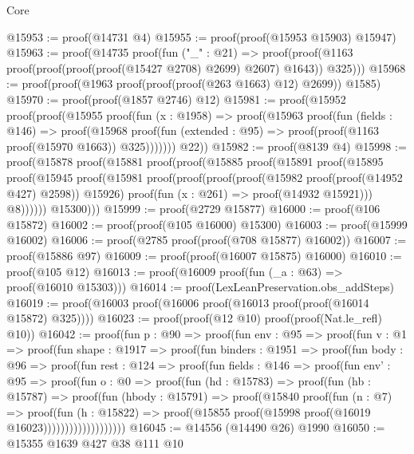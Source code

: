 \begin{lexlean}{Core}
\begin{coremodule}
@15953 := proof(@14731 @4)
@15955 := proof(proof(@15953 @15903) @15947)
@15963 := proof(@14735
      proof(fun ("_" : @21) =>
        proof(proof(@1163 proof(proof(proof(proof(@15427 @2708) @2699) @2607) @1643)) @325)))
@15968 := proof(proof(@1963 proof(proof(proof(@263 @1663) @12) @2699)) @1585)
@15970 := proof(proof(@1857 @2746) @12)
@15981 := proof(@15952
      proof(proof(@15955
            proof(fun (x : @1958) =>
              proof(@15963
                  proof(fun (fields : @146) =>
                    proof(@15968
                        proof(fun (extended : @95) =>
                          proof(proof(@1163 proof(@15970 @1663)) @325)))))))
          @22))
@15982 := proof(@8139 @4)
@15998 := proof(@15878
      proof(@15881
          proof(proof(@15885
                proof(@15891
                    proof(@15895
                        proof(@15945
                            proof(@15981
                                proof(proof(proof(proof(@15982 proof(proof(@14952 @427) @2598))
                                        @15926)
                                      proof(fun (x : @261) => proof(@14932 @15921)))
                                    @8))))))
              @15300)))
@15999 := proof(@2729 @15877)
@16000 := proof(@106 @15872)
@16002 := proof(proof(@105 @16000) @15300)
@16003 := proof(@15999 @16002)
@16006 := proof(@2785 proof(proof(@708 @15877) @16002))
@16007 := proof(@15886 @97)
@16009 := proof(proof(@16007 @15875) @16000)
@16010 := proof(@105 @12)
@16013 := proof(@16009 proof(fun (_a : @63) => proof(@16010 @15303)))
@16014 := proof(LexLeanPreservation.obs_addSteps)
@16019 := proof(@16003 proof(@16006 proof(@16013 proof(proof(@16014 @15872) @325))))
@16023 := proof(proof(@12 @10) proof(proof(Nat.le_refl) @10))
@16042 := proof(fun {p : @90} =>
    proof(fun {env : @95} =>
      proof(fun {v : @1} =>
        proof(fun {shape : @1917} =>
          proof(fun {binders : @1951} =>
            proof(fun {body : @96} =>
              proof(fun {rest : @124} =>
                proof(fun {fields : @146} =>
                  proof(fun {env' : @95} =>
                    proof(fun {o : @0} =>
                      proof(fun (hd : @15783) =>
                        proof(fun (hb : @15787) =>
                          proof(fun (hbody : @15791) =>
                            proof(@15840
                                proof(fun (n : @7) =>
                                  proof(fun (h : @15822) =>
                                    proof(@15855 proof(@15998 proof(@16019 @16023)))))))))))))))))))
@16045 := @14556 (@14490 @26) @1990
@16050 := @15355 @1639 @427 @38 @111 @10

\end{coremodule}
\end{lexlean}
